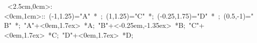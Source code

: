 
\hbox{
\xy    <2.5cm,0cm>:<0cm,1cm>::
       (-1,1.25)="A" *{\bullet}  ; (1,1.25)="C" *{\bullet};
       (-0.25,1.75)="D" *{\bullet}  ; (0.5,-1)="B" *{\bullet};
       "A"+<0em,1.7ex> *{A};
       "B"+<-0.25em,-1.35ex> *{B};
       "C"+<0em,1.7ex> *{C};
       "D"+<0em,1.7ex> *{D};
       \endxy}
